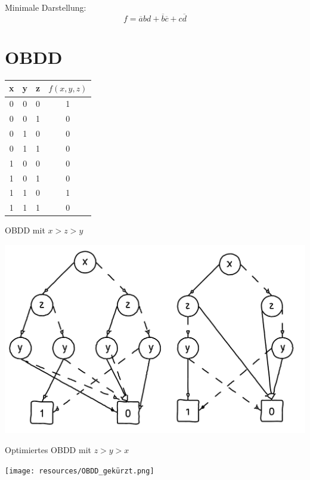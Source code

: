 \documentclass[a4paper,6pt]{article}
\begin{document}
\begin{multicols*}{3}
\scriptsize

Minimale Darstellung:
$$f = \overline{a}bd + \overline{b}\overline{c} + c\overline{d}$$


\section{OBDD}

\scriptsize
\begin{tabular}{ccc|c}
    \hline
    x & y & z & $f(x,y,z)$ \\
    \hline
    0 & 0 & 0 & 1 \\
    0 & 0 & 1 & 0 \\
    0 & 1 & 0 & 0 \\
    0 & 1 & 1 & 0 \\
    1 & 0 & 0 & 0 \\
    1 & 0 & 1 & 0 \\
    1 & 1 & 0 & 1 \\
    1 & 1 & 1 & 0 \\
    \hline
\end{tabular}

\scriptsize

OBDD mit $x > z > y$

\begin{center}
    \includegraphics[width=1\linewidth]{resources/OBDD.png}
\end{center}

Optimiertes OBDD mit $z > y > x$

\begin{center}
    \texttt{[image: resources/OBDD\_gekürzt.png]}
\end{center}

\scriptsize



\end{multicols*}
\end{document}

